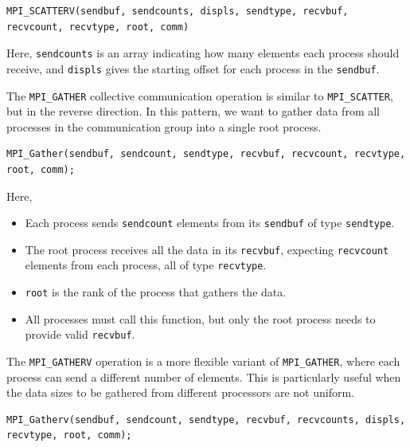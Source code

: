 \documentclass[12pt]{book}
\begin{document}
\begin{lstlisting}[style=cppstyle]
MPI_SCATTERV(sendbuf, sendcounts, displs, sendtype, recvbuf, recvcount, recvtype, root, comm)
\end{lstlisting}

Here, \texttt{sendcounts} is an array indicating how many elements each process should receive, and \texttt{displs} gives the starting offset for each process in the \texttt{sendbuf}.

The \texttt{MPI\_GATHER} collective communication operation is similar to \texttt{MPI\_SCATTER}, but in the reverse direction. In this pattern, we want to gather data from all processes in the communication group into a single root process.

\begin{lstlisting}[style=cppstyle]
MPI_Gather(sendbuf, sendcount, sendtype, recvbuf, recvcount, recvtype, root, comm);
\end{lstlisting}

Here,
\begin{itemize}
    \item Each process sends \texttt{sendcount} elements from its \texttt{sendbuf} of type \texttt{sendtype}.
    \item The root process receives all the data in its \texttt{recvbuf}, expecting \texttt{recvcount} elements from each process, all of type \texttt{recvtype}.
    \item \texttt{root} is the rank of the process that gathers the data.
    \item All processes must call this function, but only the root process needs to provide valid \texttt{recvbuf}.
\end{itemize}

\vspace{1em}
The \texttt{MPI\_GATHERV} operation is a more flexible variant of \texttt{MPI\_GATHER}, where each process can send a different number of elements. This is particularly useful when the data sizes to be gathered from different processors are not uniform.

\begin{lstlisting}[style=cppstyle]
MPI_Gatherv(sendbuf, sendcount, sendtype, recvbuf, recvcounts, displs, recvtype, root, comm);
\end{lstlisting}
\end{document}
